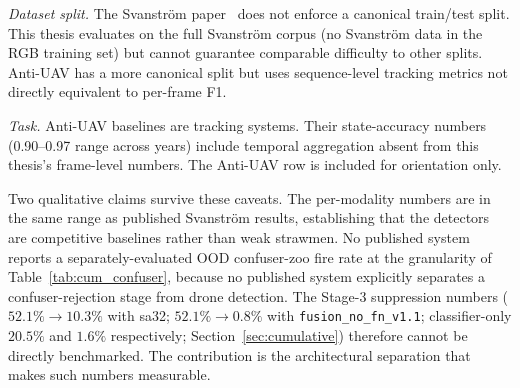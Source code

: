 \emph{Dataset split.} The Svanstr\"om paper~\cite{svanstrom2021real} does not enforce a canonical train/test split. This thesis evaluates on the full Svanstr\"om corpus (no Svanstr\"om data in the RGB training set) but cannot guarantee comparable difficulty to other splits. Anti-UAV has a more canonical split but uses sequence-level tracking metrics not directly equivalent to per-frame F1.

\emph{Task.} Anti-UAV baselines are tracking systems. Their state-accuracy numbers (0.90--0.97 range across years) include temporal aggregation absent from this thesis's frame-level numbers. The Anti-UAV row is included for orientation only.

Two qualitative claims survive these caveats. The per-modality numbers are in the same range as published Svanstr\"om results, establishing that the detectors are competitive baselines rather than weak strawmen. No published system reports a separately-evaluated OOD confuser-zoo fire rate at the granularity of Table~\ref{tab:cum_confuser}, because no published system explicitly separates a confuser-rejection stage from drone detection. The Stage-3 suppression numbers ($52.1\% \to 10.3\%$ with sa32; $52.1\% \to 0.8\%$ with \texttt{fusion\_no\_fn\_v1.1}; classifier-only $20.5\%$ and $1.6\%$ respectively; Section~\ref{sec:cumulative}) therefore cannot be directly benchmarked. The contribution is the architectural separation that makes such numbers measurable.

